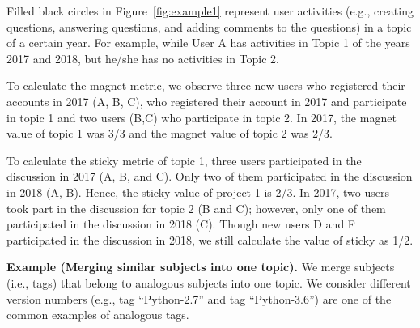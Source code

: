 \documentclass[conference]{IEEEtran}
\begin{document}
Filled black circles in Figure~\ref{fig:example1} represent user activities (e.g., creating questions, answering questions, and adding comments to the questions) in a topic of a certain year. For example, while User A has activities in Topic 1 of the years 2017 and 2018, but he/she has no activities in Topic 2.

To calculate the magnet metric, we observe three new users who registered their accounts in 2017 (A, B, C), who registered their account in 2017 and participate in topic 1 and two users (B,C) who participate in topic 2. In 2017, the magnet value of topic 1 was 3/3 and the magnet value of topic 2 was 2/3.

To calculate the sticky metric of topic 1, three users participated in the discussion in 2017 (A, B, and C). Only two of them participated in the discussion in 2018 (A, B). Hence, the sticky value of project 1 is 2/3. In 2017, two users took part in the discussion for topic 2 (B and C); however, only one of them participated in the discussion in 2018 (C). Though new users D and F participated in the discussion in 2018, we still calculate the value of sticky as 1/2.

\noindent
\textbf{Example (Merging similar subjects into one topic).}
We merge subjects (i.e., tags) that belong to analogous subjects into one topic. We consider different version numbers (e.g., tag ``Python-2.7'' and tag ``Python-3.6'') are one of the common examples of analogous tags. 
\end{document}
